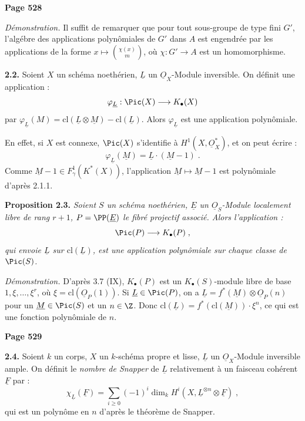 \newpage
\noindent\textbf{Page 528}

\textit{D\'emonstration.} Il suffit de remarquer que pour tout sous-groupe de type fini $G'$, l'alg\'ebre des applications polyn\^omiales de $G'$ dans $A$ est engendr\'ee par les applications de la forme $x \mapsto \binom{\chi(x)}{m}$, o\`u $\chi : G' \longrightarrow A$ est un homomorphisme.

\smallskip
\noindent\textbf{2.2.} Soient $X$ un sch\'ema noeth\'erien, $\underline{L}$ un $\underline{O}_X$-Module inversible. On d\'efinit une application :
\[
\varphi_{\underline{L}} : \Pic(X) \longrightarrow K_\bullet(X)
\]
par $\varphi_{\underline{L}}(M) = \mathrm{cl}(\underline{L} \otimes \underline{M}) - \mathrm{cl}(\underline{L})$. Alors $\varphi_{\underline{L}}$ est une application polyn\^omiale.

En effet, si $X$ est connexe, $\Pic(X)$ s'identifie \`a $H^1(X, \underline{O}_X^*)$, et on peut \'ecrire :
\[
\varphi_{\underline{L}}(\underline{M}) = \underline{L} \cdot (\underline{M} - 1)\;.
\]
Comme $\underline{M} - 1 \in F_\gamma^1(K^*(X))$, l'application $\underline{M} \mapsto \underline{M} - 1$ est polyn\^omiale d'apr\`es 2.1.1.

\smallskip
\noindent\textbf{Proposition 2.3.} \textit{Soient $S$ un sch\'ema noeth\'erien, $\underline{E}$ un $\underline{O}_S$-Module localement libre de rang $r+1$, $P = \PP(\underline{E})$ le fibr\'e projectif associ\'e. Alors l'application :
\[
\Pic(P) \longrightarrow K_\bullet(P)\;,
\]
qui envoie $\underline{L}$ sur $\mathrm{cl}(\underline{L})$, est une application polyn\^omiale sur chaque classe de $\Pic(S)$.}

\textit{D\'emonstration.} D'apr\`es 3.7 (IX), $K_\bullet(P)$ est un $K_\bullet(S)$-module libre de base $1, \xi, \ldots, \xi^r$, o\`u $\xi = \mathrm{cl}(\underline{O}_P(1))$. Si $\underline{L} \in \Pic(P)$, on a $\underline{L} = f^*(\underline{M}) \otimes \underline{O}_P(n)$ pour un $\underline{M} \in \Pic(S)$ et un $n \in \Z$. Donc $\mathrm{cl}(\underline{L}) = f^*(\mathrm{cl}(\underline{M})) \cdot \xi^n$, ce qui est une fonction polyn\^omiale de $n$.

\newpage
\noindent\textbf{Page 529}

\smallskip
\noindent\textbf{2.4.} Soient $k$ un corps, $X$ un $k$-sch\'ema propre et lisse, $\underline{L}$ un $\underline{O}_X$-Module inversible ample. On d\'efinit le \textit{nombre de Snapper} de $\underline{L}$ relativement \`a un faisceau coh\'erent $\underline{F}$ par :
\[
\chi_{\underline{L}}(\underline{F}) = \sum_{i \geq 0} (-1)^i \dim_k H^i(X, \underline{L}^{\otimes n} \otimes \underline{F})\;,
\]
qui est un polyn\^ome en $n$ d'apr\`es le th\'eor\`eme de Snapper.


